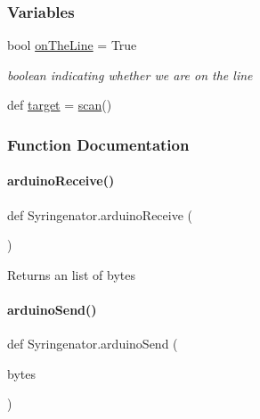 \subsubsection*{Variables}
\begin{DoxyCompactItemize}
\item 
bool \mbox{\hyperlink{namespaceSyringenator_a161fa877b77c9ebb120c1ed20739260b}{on\+The\+Line}} = True
\begin{DoxyCompactList}\small\item\em boolean indicating whether we are on the line \end{DoxyCompactList}\item 
def \mbox{\hyperlink{namespaceSyringenator_a66c7999289f77a4adce05169661f9660}{target}} = \mbox{\hyperlink{namespaceSyringenator_aff01237d3ff3e33f0ffc32927d813df0}{scan}}()
\end{DoxyCompactItemize}


\subsubsection{Function Documentation}
\mbox{\label{namespaceSyringenator_a1c5a8cf020e400c8c0337977a5b6d921}} 
\paragraph{\texorpdfstring{arduinoReceive()}{arduinoReceive()}}
{\footnotesize\ttfamily def Syringenator.\+arduino\+Receive (\begin{DoxyParamCaption}{ }\end{DoxyParamCaption})}

\begin{DoxyReturn}{Returns}
an list of bytes 
\end{DoxyReturn}
\mbox{\label{namespaceSyringenator_ae7978d5b84170226249d8de2e204e762}} 
\paragraph{\texorpdfstring{arduinoSend()}{arduinoSend()}}
{\footnotesize\ttfamily def Syringenator.\+arduino\+Send (\begin{DoxyParamCaption}\item[{}]{bytes }\end{DoxyParamCaption})}


